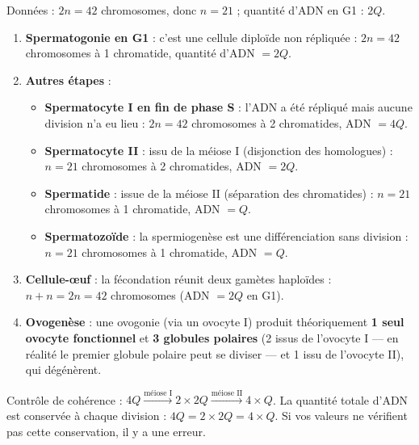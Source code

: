 \documentclass[11pt]{article}
\begin{document}
\begin{corrige}
Données : $2n = 42$ chromosomes, donc $n = 21$ ; quantité d'ADN en G1 : $2Q$.

\begin{enumerate}
\item \textbf{Spermatogonie en G1} : c'est une cellule diploïde non répliquée : $2n = 42$ chromosomes à 1 chromatide, quantité d'ADN $= 2Q$.
\item \textbf{Autres étapes} :
\begin{itemize}
\item \textbf{Spermatocyte I en fin de phase S} : l'ADN a été répliqué mais aucune division n'a eu lieu : $2n = 42$ chromosomes à 2 chromatides, ADN $= 4Q$.
\item \textbf{Spermatocyte II} : issu de la méiose I (disjonction des homologues) : $n = 21$ chromosomes à 2 chromatides, ADN $= 2Q$.
\item \textbf{Spermatide} : issue de la méiose II (séparation des chromatides) : $n = 21$ chromosomes à 1 chromatide, ADN $= Q$.
\item \textbf{Spermatozoïde} : la spermiogenèse est une différenciation sans division : $n = 21$ chromosomes à 1 chromatide, ADN $= Q$.
\end{itemize}
\item \textbf{Cellule-œuf} : la fécondation réunit deux gamètes haploïdes : $n + n = 2n = 42$ chromosomes (ADN $= 2Q$ en G1).
\item \textbf{Ovogenèse} : une ovogonie (via un ovocyte I) produit théoriquement \textbf{1 seul ovocyte fonctionnel} et \textbf{3 globules polaires} (2 issus de l'ovocyte I — en réalité le premier globule polaire peut se diviser — et 1 issu de l'ovocyte II), qui dégénèrent.
\end{enumerate}
\end{corrige}

\begin{attention}
Contrôle de cohérence : $4Q \xrightarrow{\text{méiose I}} 2 \times 2Q \xrightarrow{\text{méiose II}} 4 \times Q$. La quantité totale d'ADN est conservée à chaque division : $4Q = 2 \times 2Q = 4 \times Q$. Si vos valeurs ne vérifient pas cette conservation, il y a une erreur.
\end{attention}
\end{document}
